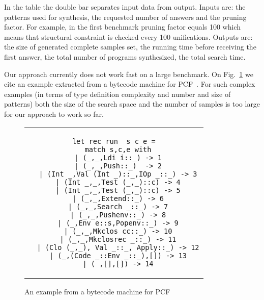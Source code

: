 In the table the double bar separates input data from output. Inputs are: the patterns used for synthesis,
the requested number of answers and the pruning factor. For example, in the first benchmark pruning factor equals 100 which means that structural constraint is checked every 100 unifications. Outputs are: the size of generated complete samples set, the running time before receiving the
first answer, the total number of programs synthesized, the total search time.

Our approach currently does not work fast on a large benchmark. On Fig.~\ref{fig:pcf} we cite an example extracted from a bytecode
machine for PCF~\cite{Plotkin1977LCFCA,maranget2008}. For such complex examples (in terms of type definition complexity and number and size of patterns)
both the size of the search space and the number of samples is too large for our approach to work so far.



\begin{figure}%
\centering
\begin{tabular}{c} %

\begin{lstlisting}
let rec run  s c e =
  match s,c,e with
  | (_,_,Ldi i::_) -> 1
  | (_,_,Push::_)  -> 2
  | (Int _,Val (Int _)::_,IOp _::_) -> 3
  | (Int _,_,Test (_,_)::c) -> 4
  | (Int _,_,Test (_,_)::c) -> 5
  | (_,_,Extend::_) -> 6
  | (_,_,Search _::_) -> 7
  | (_,_,Pushenv::_) -> 8
  | (_,Env e::s,Popenv::_) -> 9
  | (_,_,Mkclos cc::_) -> 10
  | (_,_,Mkclosrec _::_) -> 11
  | (Clo (_,_), Val _::_, Apply::_) -> 12
  | (_,(Code _::Env _::_),[]) -> 13
  | (_,[],[]) -> 14
\end{lstlisting}
\end{tabular}
\caption{An example from a bytecode machine for PCF}
\label{fig:pcf}
\end{figure}

